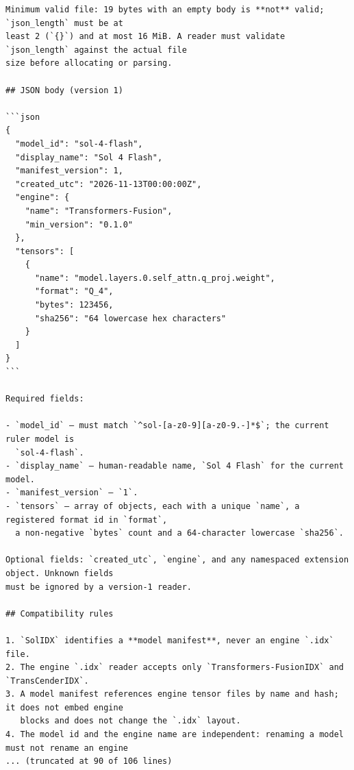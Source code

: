 \begin{verbatim}
Minimum valid file: 19 bytes with an empty body is **not** valid; `json_length` must be at
least 2 (`{}`) and at most 16 MiB. A reader must validate `json_length` against the actual file
size before allocating or parsing.

## JSON body (version 1)

```json
{
  "model_id": "sol-4-flash",
  "display_name": "Sol 4 Flash",
  "manifest_version": 1,
  "created_utc": "2026-11-13T00:00:00Z",
  "engine": {
    "name": "Transformers-Fusion",
    "min_version": "0.1.0"
  },
  "tensors": [
    {
      "name": "model.layers.0.self_attn.q_proj.weight",
      "format": "Q_4",
      "bytes": 123456,
      "sha256": "64 lowercase hex characters"
    }
  ]
}
```

Required fields:

- `model_id` — must match `^sol-[a-z0-9][a-z0-9.-]*$`; the current ruler model is
  `sol-4-flash`.
- `display_name` — human-readable name, `Sol 4 Flash` for the current model.
- `manifest_version` — `1`.
- `tensors` — array of objects, each with a unique `name`, a registered format id in `format`,
  a non-negative `bytes` count and a 64-character lowercase `sha256`.

Optional fields: `created_utc`, `engine`, and any namespaced extension object. Unknown fields
must be ignored by a version-1 reader.

## Compatibility rules

1. `SolIDX` identifies a **model manifest**, never an engine `.idx` file.
2. The engine `.idx` reader accepts only `Transformers-FusionIDX` and `TransCenderIDX`.
3. A model manifest references engine tensor files by name and hash; it does not embed engine
   blocks and does not change the `.idx` layout.
4. The model id and the engine name are independent: renaming a model must not rename an engine
... (truncated at 90 of 106 lines)
\end{verbatim}


